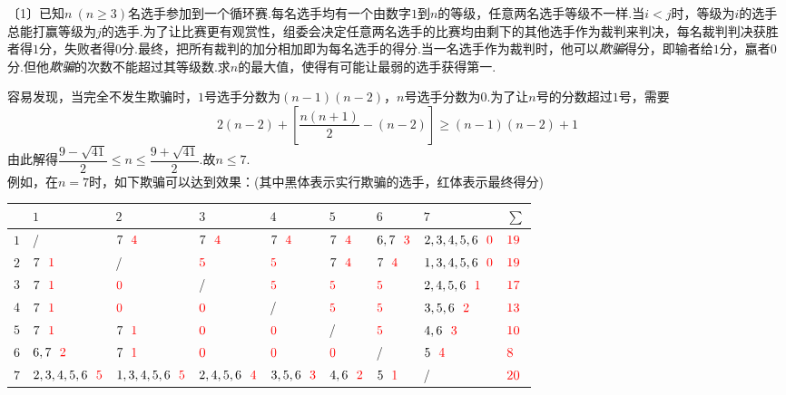 \documentclass[lang=cn, zihao=4.5]{elegantbook}
\newcommand{\nd}[1]{〔#1〕}
\newcommand{\hlt}[1]{\color{red} #1 \color{black}}
\begin{document}
\begin{example} %
	\nd{1}已知$n~(n \geq 3)$名选手参加到一个循环赛.每名选手均有一个由数字$1$到$n$的等级，任意两名选手等级不一样.当$i < j$时，等级为$i$的选手总能打赢等级为$j$的选手.为了让比赛更有观赏性，组委会决定任意两名选手的比赛均由剩下的其他选手作为裁判来判决，每名裁判判决获胜者得$1$分，失败者得$0$分.最终，把所有裁判的加分相加即为每名选手的得分.当一名选手作为裁判时，他可以\textit{欺骗}得分，即输者给$1$分，嬴者$0$分.但他\textit{欺骗}的次数不能超过其等级数.求$n$的最大值，使得有可能让最弱的选手获得第一.
\end{example}
\begin{solution}
	容易发现，当完全不发生欺骗时，$1$号选手分数为$(n-1)(n-2)$，$n$号选手分数为$0$.为了让$n$号的分数超过$1$号，需要$$2(n-2)+\left[ \frac{n(n+1)}{2} - (n-2) \right] \geq (n-1)(n-2)+1$$
	由此解得$\dfrac{9-\sqrt{41}}{2} \leq n \leq \dfrac{9+\sqrt{41}}{2}$.故$n \leq 7$. \\
	例如，在$n=7$时，如下欺骗可以达到效果：(其中黑体表示实行欺骗的选手，红体表示最终得分)
	
	\begin{table}[h]
	\centering
	\renewcommand\arraystretch{1.3}
\begin{tabular}{|l|l|l|l|l|l|l|l|l|}
\hline
    & $1$         & $2$         & $3$       & $4$     & $5$   & $6$   & $7$         & $\sum$ \\ \hline
$1$ & /           & $7~~\hlt{4}$         & $7~~\hlt{4}$       & $7~~\hlt{4}$     & $7~~\hlt{4}$   & $6,7~~\hlt{3}$ & $2,3,4,5,6~~\hlt{0}$ & $\hlt{19}$   \\ \hline
$2$ & $7~~\hlt{1}$         & /           & $\hlt{5}$          & $\hlt{5}$        & $7~~\hlt{4}$   & $7~~\hlt{4}$   & $1,3,4,5,6~~\hlt{0}$ & $\hlt{19}$   \\ \hline
$3$ & $7~~\hlt{1}$         & $\hlt{0}$            & /         & $\hlt{5}$        & $\hlt{5}$      & $\hlt{5}$      & $2,4,5,6~~\hlt{1}$   & $\hlt{17}$   \\ \hline
$4$ & $7~~\hlt{1}$         & $\hlt{0}$            & $\hlt{0}$          & /       & $\hlt{5}$      & $\hlt{5}$      & $3,5,6~~\hlt{2}$     & $\hlt{13}$   \\ \hline
$5$ & $7~~\hlt{1}$         & $7~~\hlt{1}$         & $\hlt{0}$          & $\hlt{0}$        & /     & $\hlt{5}$      & $4,6~~\hlt{3}$       & $\hlt{10}$   \\ \hline
$6$ & $6,7~~\hlt{2}$       & $7~~\hlt{1}$         & $\hlt{0}$          & $\hlt{0}$        & $\hlt{0}$      & /     & $5~~\hlt{4}$         & $\hlt{8}$    \\ \hline
$7$ & $2,3,4,5,6~~\hlt{5}$ & $1,3,4,5,6~~\hlt{5}$ & $2,4,5,6~~\hlt{4}$ & $3,5,6~~\hlt{3}$ & $4,6~~\hlt{2}$ & $5~~\hlt{1}$   & /           & $\hlt{20}$   \\ \hline
\end{tabular}
\end{table}
\end{solution}
\end{document}
